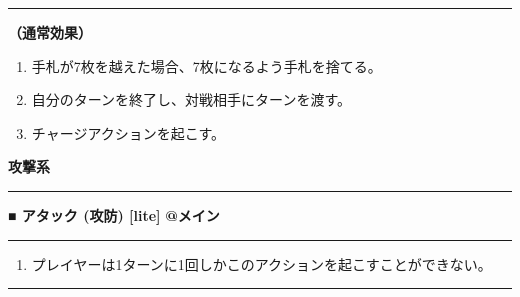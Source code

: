 \documentclass[twocolumn,a5paper,papersize,10pt]{jarticle}
\begin{document}
\vspace{1mm}%
\hrule height 0.1mm depth 0mm width 66.5mm %
\vspace{1mm}%

{\bf（通常効果）}


\vspace{-1zh}%
\begin{enumerate}
\setlength{\leftskip}{-0.3cm}
\setlength{\parskip}{0pt} %

\item 手札が7枚を越えた場合、7枚になるよう手札を捨てる。

\item 自分のターンを終了し、対戦相手にターンを渡す。

\item チャージアクションを起こす。
\vspace{-1zh}%
\end{enumerate}


\begin{tcolorbox}
{\scriptsize\bf 攻撃系}
\end{tcolorbox}
\vspace{-1zh}%
\vspace{2mm} %
\hrule height 0.5mm depth 0mm width 66.5mm %
\vspace{1mm} %
{\small\bf ■ アタック {\scriptsize (攻防) [lite]}} %
\hfill 
{\footnotesize\bf @メイン }


\vspace{1mm}%
\hrule height 0.1mm depth 0mm width 66.5mm %
\vspace{1mm}%


\vspace{-1zh}%
\begin{enumerate}
\renewcommand{\labelenumi}{※}
\setlength{\leftskip}{-0.3cm}
\setlength{\itemsep}{0pt} %
\setlength{\parskip}{0pt} %

\item プレイヤーは1ターンに1回しかこのアクションを起こすことができない。

\vspace{-3mm}%
\end{enumerate}
\vspace{1mm}%
\hrule height 0.1mm depth 0mm width 66.5mm %
\vspace{1mm}%
\end{document}
